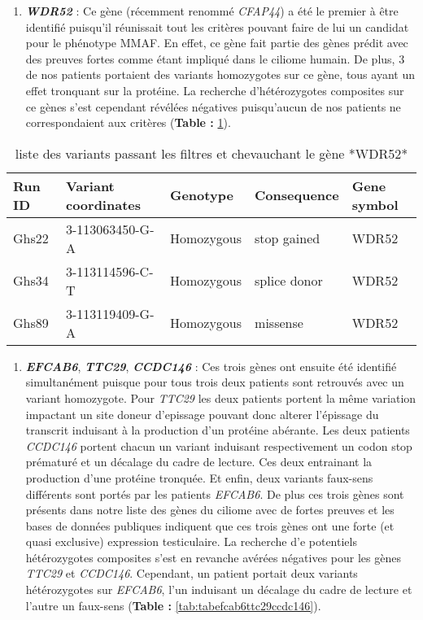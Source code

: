 \documentclass[12pt,twoside]{reedthesis}
\providecommand{\tightlist}{%
  \setlength{\itemsep}{0pt}\setlength{\parskip}{0pt}}
\theoremstyle{definition}
\theoremstyle{definition}
\theoremstyle{remark}
\begin{document}
  \begin{enumerate}
  \def\labelenumi{\arabic{enumi}.}
  \tightlist
  \item
    \textbf{\emph{WDR52}} : Ce gène (récemment renommé \emph{CFAP44}) a
    été le premier à être identifié puisqu'il réunissait tout les critères
    pouvant faire de lui un candidat pour le phénotype MMAF. En effet, ce
    gène fait partie des gènes prédit avec des preuves fortes comme étant
    impliqué dans le ciliome humain. De plus, 3 de nos patients portaient
    des variants homozygotes sur ce gène, tous ayant un effet tronquant
    sur la protéine. La recherche d'hétérozygotes composites sur ce gènes
    s'est cependant révélées négatives puisqu'aucun de nos patients ne
    correspondaient aux critères (\textbf{Table : }\ref{tab:tabwdr52}).
  \end{enumerate}
  
  \begin{longtable}[t]{lllll}
  \caption{\label{tab:tabwdr52}liste des variants passant les filtres et chevauchant le gène *WDR52*}\\
  \toprule
  Run ID & Variant coordinates & Genotype & Consequence & Gene symbol\\
  \midrule
  Ghs22 & 3-113063450-G-A & Homozygous & stop gained & WDR52\\
  Ghs34 & 3-113114596-C-T & Homozygous & splice donor & WDR52\\
  Ghs89 & 3-113119409-G-A & Homozygous & missense & WDR52\\
  \bottomrule
  \end{longtable}
  
  \begin{enumerate}
  \def\labelenumi{\arabic{enumi}.}
  \setcounter{enumi}{1}
  \tightlist
  \item
    \textbf{\emph{EFCAB6}}, \textbf{\emph{TTC29}}, \textbf{\emph{CCDC146}}
    : Ces trois gènes ont ensuite été identifié simultanément puisque pour
    tous trois deux patients sont retrouvés avec un variant homozygote.
    Pour \emph{TTC29} les deux patients portent la même variation
    impactant un site doneur d'epissage pouvant donc alterer l'épissage du
    transcrit induisant à la production d'un protéine abérante. Les deux
    patients \emph{CCDC146} portent chacun un variant induisant
    respectivement un codon stop prématuré et un décalage du cadre de
    lecture. Ces deux entrainant la production d'une protéine tronquée. Et
    enfin, deux variants faux-sens différents sont portés par les patients
    \emph{EFCAB6}. De plus ces trois gènes sont présents dans notre liste
    des gènes du ciliome avec de fortes preuves et les bases de données
    publiques indiquent que ces trois gènes ont une forte (et quasi
    exclusive) expression testiculaire. La recherche d'e potentiels
    hétérozygotes composites s'est en revanche avérées négatives pour les
    gènes \emph{TTC29} et \emph{CCDC146}. Cependant, un patient portait
    deux variants hétérozygotes sur \emph{EFCAB6}, l'un induisant un
    décalage du cadre de lecture et l'autre un faux-sens (\textbf{Table :
    }\ref{tab:tabefcab6ttc29ccdc146}). \newpage
  \end{enumerate}
  
\end{document}
